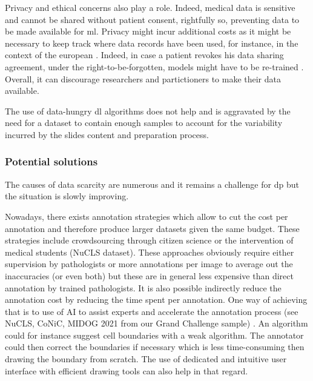 Privacy and ethical concerns also play a role. Indeed, medical data is sensitive and cannot be shared without patient consent, rightfully so, preventing data to be made available for \acrlong{ml}. Privacy might incur additional costs as it might be necessary to keep track where data records have been used, for instance, in the context of the european . Indeed, in case a patient revokes his data sharing agreement, under the right-to-be-forgotten, models might have to be re-trained \parencite{humerick2017taking}. Overall, it can discourage researchers and partictioners to make their data available. 

The use of data-hungry \acrlong{dl} algorithms does not help and is aggravated by the need for a dataset to contain enough samples to account for the variability incurred by the slides content and preparation process. 


\subsubsection{Potential solutions}
\label{sssec:backdp:ds-solutions}

The causes of data scarcity are numerous and it remains a challenge for \acrlong{dp} but the situation is slowly improving. 

Nowadays, there exists annotation strategies which allow to cut the cost per annotation and therefore produce larger datasets given the same budget. These strategies include crowdsourcing through citizen science \parencite{peplow2016citizen} or the intervention of medical students (\eg NuCLS dataset). These approaches obviously require either supervision by pathologists or more annotations per image to average out the inaccuracies (or even both) but these are in general less expensive than direct annotation by trained pathologists. It is also possible indirectly reduce the annotation cost by reducing the time spent per annotation. One way of achieving that is to use of AI to assist experts and accelerate the annotation process (see NuCLS, CoNiC, MIDOG 2021 from our Grand Challenge sample) \parencite{chai2020human}. An algorithm could for instance suggest cell boundaries with a weak algorithm. The annotator could then correct the boundaries if necessary which is less time-consuming then drawing the boundary from scratch. The use of dedicated and intuitive user interface with efficient drawing tools can also help in that regard.  

